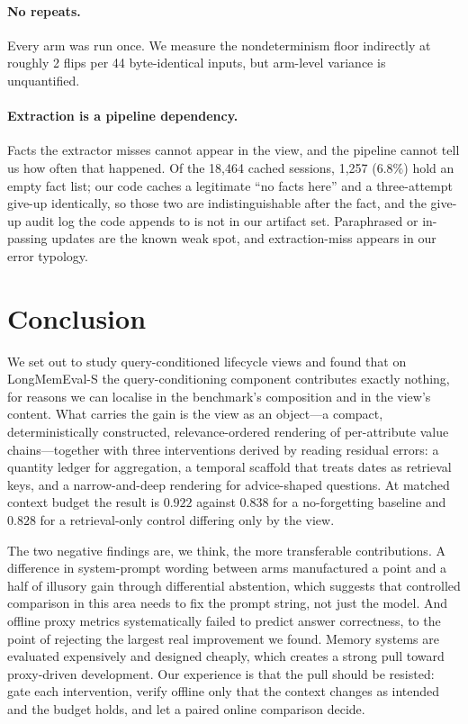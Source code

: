 \documentclass[11pt]{article}
\begin{document}
\paragraph{No repeats.} Every arm was run once. We measure the nondeterminism floor indirectly at roughly 2 flips per 44 byte-identical inputs, but arm-level variance is unquantified.

\paragraph{Extraction is a pipeline dependency.} Facts the extractor misses cannot appear in the view, and the pipeline cannot tell us how often that happened. Of the 18{,}464 cached sessions, 1{,}257 ($6.8\%$) hold an empty fact list; our code caches a legitimate ``no facts here'' and a three-attempt give-up identically, so those two are indistinguishable after the fact, and the give-up audit log the code appends to is not in our artifact set. Paraphrased or in-passing updates are the known weak spot, and extraction-miss appears in our error typology.

\section{Conclusion}

We set out to study query-conditioned lifecycle views and found that on LongMemEval-S the query-conditioning component contributes exactly nothing, for reasons we can localise in the benchmark's composition and in the view's content. What carries the gain is the view as an object---a compact, deterministically constructed, relevance-ordered rendering of per-attribute value chains---together with three interventions derived by reading residual errors: a quantity ledger for aggregation, a temporal scaffold that treats dates as retrieval keys, and a narrow-and-deep rendering for advice-shaped questions. At matched context budget the result is $0.922$ against $0.838$ for a no-forgetting baseline and $0.828$ for a retrieval-only control differing only by the view.

The two negative findings are, we think, the more transferable contributions. A difference in system-prompt wording between arms manufactured a point and a half of illusory gain through differential abstention, which suggests that controlled comparison in this area needs to fix the prompt string, not just the model. And offline proxy metrics systematically failed to predict answer correctness, to the point of rejecting the largest real improvement we found. Memory systems are evaluated expensively and designed cheaply, which creates a strong pull toward proxy-driven development. Our experience is that the pull should be resisted: gate each intervention, verify offline only that the context changes as intended and the budget holds, and let a paired online comparison decide.
\end{document}
